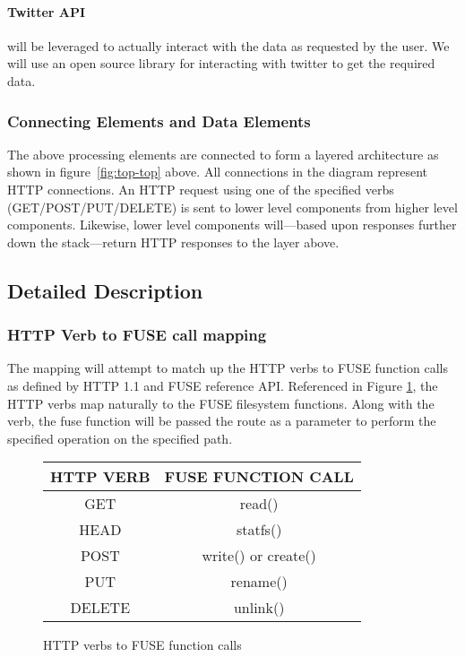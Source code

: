 \paragraph{Twitter API} will be leveraged to actually interact with the data as
requested by the user.  We will use an open source library for interacting with
twitter to get the required data.

\subsubsection{Connecting Elements and Data Elements}

The above processing elements are connected to form a layered architecture as
shown in figure~\ref{fig:top-top} above. All connections in the diagram
represent HTTP connections. An HTTP request using one of the specified verbs
(GET/POST/PUT/DELETE) is sent to lower level components from higher level
components. Likewise, lower level components will---based upon responses further
down the stack---return HTTP responses to the layer above.

\subsection{Detailed Description}
\subsubsection{HTTP Verb to FUSE call mapping}
The mapping will attempt to match up the HTTP verbs to FUSE function calls as defined by HTTP 1.1 and FUSE reference API. Referenced in Figure \ref{fig:httpverbs}, the HTTP verbs map naturally to the FUSE filesystem functions. Along with the verb, the fuse function will be passed the route as a parameter to perform the specified operation on the specified path.   
\begin{figure}[H]
\centering
\begin{tabular}{|c|c|}
\hline
HTTP VERB & FUSE FUNCTION CALL \\\hline

GET & read()\\

HEAD & statfs() \\

POST  & write() or create() \\

PUT & rename() \\

DELETE & unlink() \\\hline


\end{tabular}

\caption{HTTP verbs to FUSE function calls}\label{fig:httpverbs}
\end{figure}


